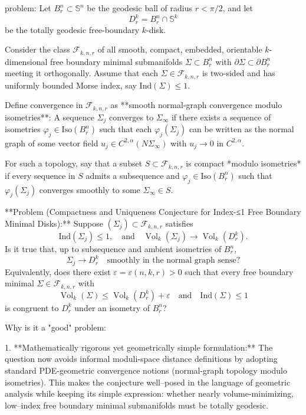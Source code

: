 problem:  
Let \(B_r^n \subset \mathbb{S}^n\) be the geodesic ball of radius \(r < \pi/2\), and let 
\[
D_r^k = B_r^n \cap \mathbb{S}^k
\]
be the totally geodesic free-boundary \(k\)-disk.  

Consider the class \(\mathcal{F}_{k,n,r}\) of all smooth, compact, embedded, orientable \(k\)-dimensional free boundary minimal submanifolds \(\Sigma \subset B_r^n\) with \(\partial \Sigma \subset \partial B_r^n\) meeting it orthogonally.  
Assume that each \(\Sigma\in \mathcal{F}_{k,n,r}\) is two-sided and has uniformly bounded Morse index, say \(\mathrm{Ind}(\Sigma) \le 1\).

Define convergence in \(\mathcal{F}_{k,n,r}\) as **smooth normal-graph convergence modulo isometries**:  
A sequence \(\Sigma_j\) converges to \(\Sigma_\infty\) if there exists a sequence of isometries \(\varphi_j \in \mathrm{Iso}(B_r^n)\) such that each \(\varphi_j(\Sigma_j)\) can be written as the normal graph of some vector field \(u_j \in C^{2,\alpha}(N\Sigma_\infty)\) with \(u_j \to 0\) in \(C^{2,\alpha}\).

For such a topology, say that a subset \(S \subset \mathcal{F}_{k,n,r}\) is compact *modulo isometries* if every sequence in \(S\) admits a subsequence and \(\varphi_j \in \mathrm{Iso}(B_r^n)\) such that \(\varphi_j(\Sigma_j)\) converges smoothly to some \(\Sigma_\infty \in S\).

**Problem (Compactness and Uniqueness Conjecture for Index-≤1 Free Boundary Minimal Disks):**  
Suppose \((\Sigma_j) \subset \mathcal{F}_{k,n,r}\) satisfies  
\[
\mathrm{Ind}(\Sigma_j) \le 1, 
\quad \text{and} \quad
\operatorname{Vol}_k(\Sigma_j) \to \operatorname{Vol}_k(D_r^k).
\]  
Is it true that, up to subsequence and ambient isometries of \(B_r^n\),  
\[
\Sigma_j \to D_r^k 
\quad \text{smoothly in the normal graph sense?}
\]
Equivalently, does there exist \(\varepsilon = \varepsilon(n,k,r) > 0\) such that every free boundary minimal \(\Sigma \in \mathcal{F}_{k,n,r}\) with  
\[
\operatorname{Vol}_k(\Sigma) \le \operatorname{Vol}_k(D_r^k) + \varepsilon
\quad \text{and} \quad \mathrm{Ind}(\Sigma) \le 1
\]
is congruent to \(D_r^k\) under an isometry of \(B_r^n\)?

Why is it a "good" problem:  

1. **Mathematically rigorous yet geometrically simple formulation:**  
   The question now avoids informal moduli-space distance definitions by adopting standard PDE-geometric convergence notions (normal-graph topology modulo isometries). This makes the conjecture well–posed in the language of geometric analysis while keeping its simple expression: whether nearly volume-minimizing, low–index free boundary minimal submanifolds must be totally geodesic.

